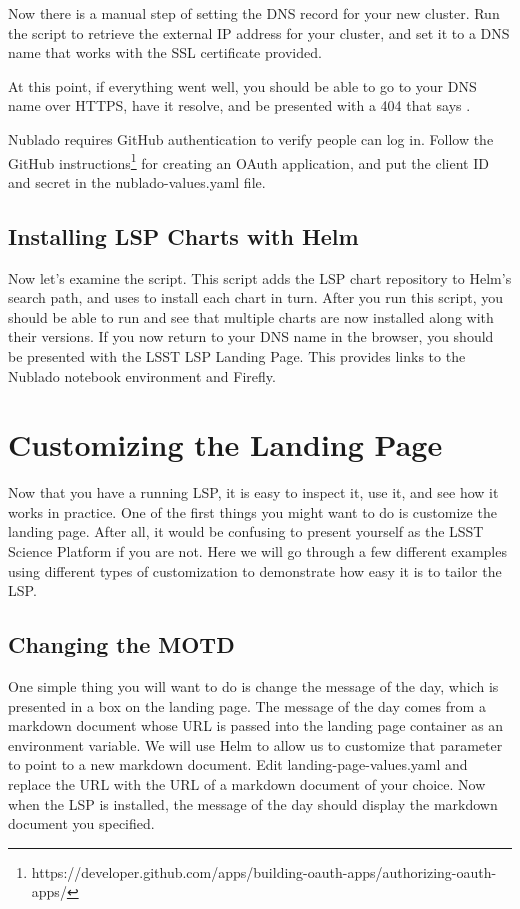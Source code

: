 \documentclass[11pt,twoside]{article}
\begin{document}
Now there is a manual step of setting the DNS record for your new cluster.
Run the  script to retrieve the external IP address for your
cluster, and set it to a DNS name that works with the SSL certificate provided.

At this point, if everything went well, you should be able to go to your
DNS name over HTTPS, have it resolve, and be presented with a 404 that says
.

Nublado requires GitHub authentication to verify people can log in.  Follow
the GitHub instructions\footnote{
https://developer.github.com/apps/building-oauth-apps/authorizing-oauth-apps/
} for creating an OAuth application, and put the client ID and secret in the
nublado-values.yaml file.

\subsection{Installing LSP Charts with Helm}

Now let's examine the  script.  This script adds the LSP
chart repository to Helm's search path, and uses  to install
each chart in turn.  After you run this script, you should be able to run 
and see that multiple charts are now installed along with their versions.  If you
now return to your DNS name in the browser, you should be presented with the LSST
LSP Landing Page.  This provides links to the Nublado notebook environment and
Firefly.

\section{Customizing the Landing Page}

Now that you have a running LSP, it is easy to inspect it, use it, and see
how it works in practice.  One of the first things you might want to do is
customize the landing page.  After all, it would be confusing to present
yourself as the LSST Science Platform if you are not.  Here we will go
through a few different examples using different types of customization
to demonstrate how easy it is to tailor the LSP.

\subsection{Changing the MOTD}

One simple thing you will want to do is change the message of the day,
which is presented in a box on the landing page.
The message of the day comes from a markdown document whose URL is passed
into the landing page container as an environment variable.
We will use Helm to allow us to customize that parameter
to point to a new markdown document.  Edit landing-page-values.yaml
and replace the  URL with the URL of a markdown document
of your choice. Now when the LSP is installed, the message of the day should display
the markdown document you specified.
\end{document}
